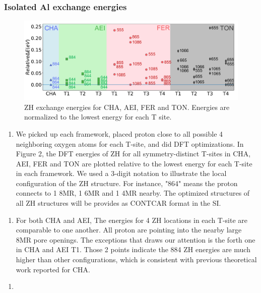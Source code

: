 \documentclass[12pt]{article}
\begin{document}
\subsubsection*{Isolated Al exchange energies}
\begin{figure}[H]
\centering
  \includegraphics[width=5.2in]{./Figures/Figure-2}
  \caption{ZH exchange energies for CHA, AEI, FER and TON. Energies are normalized to the lowest energy for each T site.}
  \label{ZH energies}
\end{figure}

\begin{enumerate}
\item We picked up each framework, placed proton close to all possible 4 neighboring oxygen atoms for each T-site, and did DFT optimizations. In Figure 2, the DFT energies of ZH for all symmetry-distinct T-sites in CHA, AEI, FER and TON are plotted relative to the lowest energy for each T-site in each framework. We used a 3-digit notation to illustrate the local configuration of the ZH structure. For instance, "864" means the proton connects to 1 8MR, 1 6MR and 1 4MR nearby. The optimized structures of all ZH structures will be provides as CONTCAR format in the SI.
\end{enumerate}

\begin{enumerate}[resume]
\item For both CHA and AEI, The energies for 4 ZH locations in each T-site are comparable to one another. All proton are pointing into the nearby large 8MR pore openings. The exceptions that draws our attention is the forth one in CHA and AEI T1. Those 2 points indicate the 884 ZH energies are much higher than other configurations, which is consistent with previous theoretical work reported for CHA.\citep{Li2018JPCC}
\end{enumerate}

\begin{enumerate}[resume]
\item 
\end{enumerate}
\end{document}
